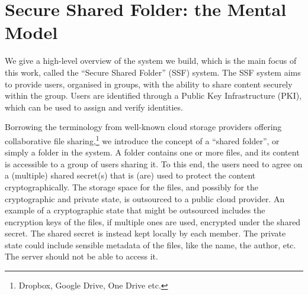 

\section{Secure Shared Folder: the Mental Model}\label{sc:mental-model}

We give a high-level overview of the system we build,
which is the main focus of this work, 
called the ``Secure Shared Folder'' (SSF) system.
The SSF system aims to provide users, organised in groups, 
with the ability to share content securely within the group.
Users are identified through a Public Key Infrastructure (PKI),
which can be used to assign and verify identities.

Borrowing the terminology from well-known cloud storage providers offering collaborative file sharing,\footnote{Dropbox, Google Drive, One Drive etc.}
we introduce the concept of a ``shared folder'', or simply a folder in the system.
A folder contains one or more files, and its content is accessible to a group of users sharing it.
To this end, the users need to agree on a (multiple) shared secret(s) that is (are) used to protect the content cryptographically.
The storage space for the files, and possibly for the cryptographic and private state, is outsourced to a public cloud provider.
An example of a cryptographic state that might be outsourced includes the encryption keys of the files, if multiple ones are used, encrypted under the
shared secret. The shared secret is instead kept locally by each member. The private state could include sensible metadata of the files,
like the name, the author, etc. The server should not be able to access it.

